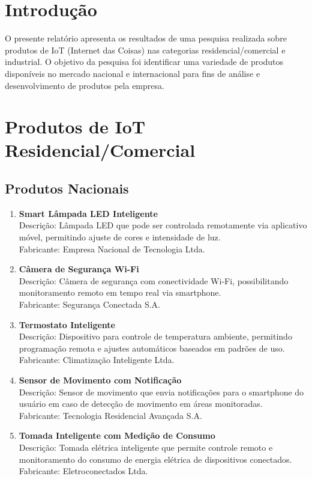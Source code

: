 \documentclass{estacio}
\begin{document}
\maketitle

\section{Introdução}
O presente relatório apresenta os resultados de uma pesquisa realizada sobre produtos de IoT (Internet das Coisas) nas categorias residencial/comercial e industrial. O objetivo da pesquisa foi identificar uma variedade de produtos disponíveis no mercado nacional e internacional para fins de análise e desenvolvimento de produtos pela empresa.

\section{Produtos de IoT Residencial/Comercial}

\subsection{Produtos Nacionais}

\begin{enumerate}
    \item \textbf{Smart Lâmpada LED Inteligente}\\
    Descrição: Lâmpada LED que pode ser controlada remotamente via aplicativo móvel, permitindo ajuste de cores e intensidade de luz.\\
    Fabricante: Empresa Nacional de Tecnologia Ltda.

    \item \textbf{Câmera de Segurança Wi-Fi}\\
    Descrição: Câmera de segurança com conectividade Wi-Fi, possibilitando monitoramento remoto em tempo real via smartphone.\\
    Fabricante: Segurança Conectada S.A.

    \item \textbf{Termostato Inteligente}\\
    Descrição: Dispositivo para controle de temperatura ambiente, permitindo programação remota e ajustes automáticos baseados em padrões de uso.\\
    Fabricante: Climatização Inteligente Ltda.

    \item \textbf{Sensor de Movimento com Notificação}\\
    Descrição: Sensor de movimento que envia notificações para o smartphone do usuário em caso de detecção de movimento em áreas monitoradas.\\
    Fabricante: Tecnologia Residencial Avançada S.A.

    \item \textbf{Tomada Inteligente com Medição de Consumo}\\
    Descrição: Tomada elétrica inteligente que permite controle remoto e monitoramento do consumo de energia elétrica de dispositivos conectados.\\
    Fabricante: Eletroconectados Ltda.
\end{enumerate}
\end{document}
